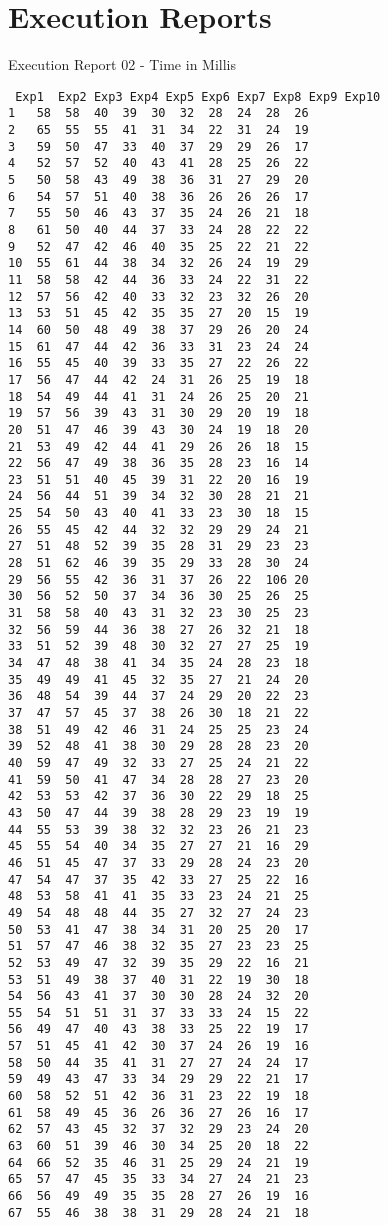 \apendice
\chapter{Execution Reports}
\label{executionreport02}

Execution Report 02 - Time in Millis
\begin{lstlisting}
 Exp1  Exp2 Exp3 Exp4 Exp5 Exp6 Exp7 Exp8 Exp9 Exp10
1	58	58	40	39	30	32	28	24	28	26
2	65	55	55	41	31	34	22	31	24	19
3	59	50	47	33	40	37	29	29	26	17
4	52	57	52	40	43	41	28	25	26	22
5	50	58	43	49	38	36	31	27	29	20
6	54	57	51	40	38	36	26	26	26	17
7	55	50	46	43	37	35	24	26	21	18
8	61	50	40	44	37	33	24	28	22	22
9	52	47	42	46	40	35	25	22	21	22
10	55	61	44	38	34	32	26	24	19	29
11	58	58	42	44	36	33	24	22	31	22
12	57	56	42	40	33	32	23	32	26	20
13	53	51	45	42	35	35	27	20	15	19
14	60	50	48	49	38	37	29	26	20	24
15	61	47	44	42	36	33	31	23	24	24
16	55	45	40	39	33	35	27	22	26	22
17	56	47	44	42	24	31	26	25	19	18
18	54	49	44	41	31	24	26	25	20	21
19	57	56	39	43	31	30	29	20	19	18
20	51	47	46	39	43	30	24	19	18	20
21	53	49	42	44	41	29	26	26	18	15
22	56	47	49	38	36	35	28	23	16	14
23	51	51	40	45	39	31	22	20	16	19
24	56	44	51	39	34	32	30	28	21	21
25	54	50	43	40	41	33	23	30	18	15
26	55	45	42	44	32	32	29	29	24	21
27	51	48	52	39	35	28	31	29	23	23
28	51	62	46	39	35	29	33	28	30	24
29	56	55	42	36	31	37	26	22	106	20
30	56	52	50	37	34	36	30	25	26	25
31	58	58	40	43	31	32	23	30	25	23
32	56	59	44	36	38	27	26	32	21	18
33	51	52	39	48	30	32	27	27	25	19
34	47	48	38	41	34	35	24	28	23	18
35	49	49	41	45	32	35	27	21	24	20
36	48	54	39	44	37	24	29	20	22	23
37	47	57	45	37	38	26	30	18	21	22
38	51	49	42	46	31	24	25	25	23	24
39	52	48	41	38	30	29	28	28	23	20
40	59	47	49	32	33	27	25	24	21	22
41	59	50	41	47	34	28	28	27	23	20
42	53	53	42	37	36	30	22	29	18	25
43	50	47	44	39	38	28	29	23	19	19
44	55	53	39	38	32	32	23	26	21	23
45	55	54	40	34	35	27	27	21	16	29
46	51	45	47	37	33	29	28	24	23	20
47	54	47	37	35	42	33	27	25	22	16
48	53	58	41	41	35	33	23	24	21	25
49	54	48	48	44	35	27	32	27	24	23
50	53	41	47	38	34	31	20	25	20	17
51	57	47	46	38	32	35	27	23	23	25
52	53	49	47	32	39	35	29	22	16	21
53	51	49	38	37	40	31	22	19	30	18
54	56	43	41	37	30	30	28	24	32	20
55	54	51	51	31	37	33	33	24	15	22
56	49	47	40	43	38	33	25	22	19	17
57	51	45	41	42	30	37	24	26	19	16
58	50	44	35	41	31	27	27	24	24	17
59	49	43	47	33	34	29	29	22	21	17
60	58	52	51	42	36	31	23	22	19	18
61	58	49	45	36	26	36	27	26	16	17
62	57	43	45	32	37	32	29	23	24	20
63	60	51	39	46	30	34	25	20	18	22
64	66	52	35	46	31	25	29	24	21	19
65	57	47	45	35	33	34	27	24	21	23
66	56	49	49	35	35	28	27	26	19	16
67	55	46	38	38	31	29	28	24	21	18

\end{lstlisting}
